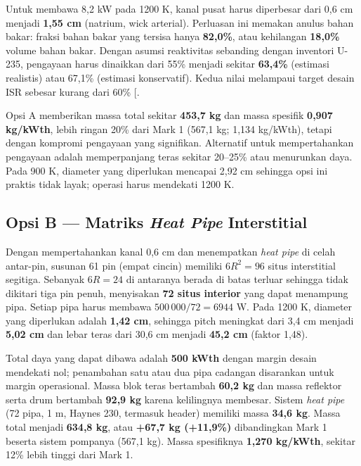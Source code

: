 \documentclass[
  indonesian,
  12pt,
  a4paper,
]{report}
\begin{document}
Untuk membawa 8,2 kW pada 1200 K, kanal pusat harus diperbesar dari 0,6
cm menjadi \textbf{1,55 cm} (natrium, wick arterial). Perluasan ini
memakan anulus bahan bakar: fraksi bahan bakar yang tersisa hanya
\textbf{82,0\%}, atau kehilangan \textbf{18,0\%} volume bahan bakar.
Dengan asumsi reaktivitas sebanding dengan inventori U-235, pengayaan
harus dinaikkan dari 55\% menjadi sekitar \textbf{63,4\%} (estimasi
realistis) atau 67,1\% (estimasi konservatif). Kedua nilai melampaui
target desain ISR sebesar kurang dari 60\%
{[}\citeproc{ref-khandaq2020}{7}{]}.

Opsi A memberikan massa total sekitar \textbf{453,7 kg} dan massa
spesifik \textbf{0,907 kg/kWth}, lebih ringan 20\% dari Mark 1 (567,1
kg; 1,134 kg/kWth), tetapi dengan kompromi pengayaan yang signifikan.
Alternatif untuk mempertahankan pengayaan adalah memperpanjang teras
sekitar 20--25\% atau menurunkan daya. Pada 900 K, diameter yang
diperlukan mencapai 2,92 cm sehingga opsi ini praktis tidak layak;
operasi harus mendekati 1200 K.

\subsection{\texorpdfstring{Opsi B --- Matriks \emph{Heat Pipe}
Interstitial}{Opsi B --- Matriks Heat Pipe Interstitial}}\label{opsi-b-matriks-heat-pipe-interstitial}

Dengan mempertahankan kanal 0,6 cm dan menempatkan \emph{heat pipe} di
celah antar-pin, susunan 61 pin (empat cincin) memiliki \(6R^2=96\)
situs interstitial segitiga. Sebanyak \(6R=24\) di antaranya berada di
batas terluar sehingga tidak dikitari tiga pin penuh, menyisakan
\textbf{72 situs interior} yang dapat menampung pipa. Setiap pipa harus
membawa \(500\,000/72=6944\) W. Pada 1200 K, diameter yang diperlukan
adalah \textbf{1,42 cm}, sehingga pitch meningkat dari 3,4 cm menjadi
\textbf{5,02 cm} dan lebar teras dari 30,6 cm menjadi \textbf{45,2 cm}
(faktor 1,48).

Total daya yang dapat dibawa adalah \textbf{500 kWth} dengan margin
desain mendekati nol; penambahan satu atau dua pipa cadangan disarankan
untuk margin operasional. Massa blok teras bertambah \textbf{60,2 kg}
dan massa reflektor serta drum bertambah \textbf{92,9 kg} karena
kelilingnya membesar. Sistem \emph{heat pipe} (72 pipa, 1 m, Haynes 230,
termasuk header) memiliki massa \textbf{34,6 kg}. Massa total menjadi
\textbf{634,8 kg}, atau \textbf{+67,7 kg (+11,9\%)} dibandingkan Mark 1
beserta sistem pompanya (567,1 kg). Massa spesifiknya \textbf{1,270
kg/kWth}, sekitar 12\% lebih tinggi dari Mark 1.
\end{document}
